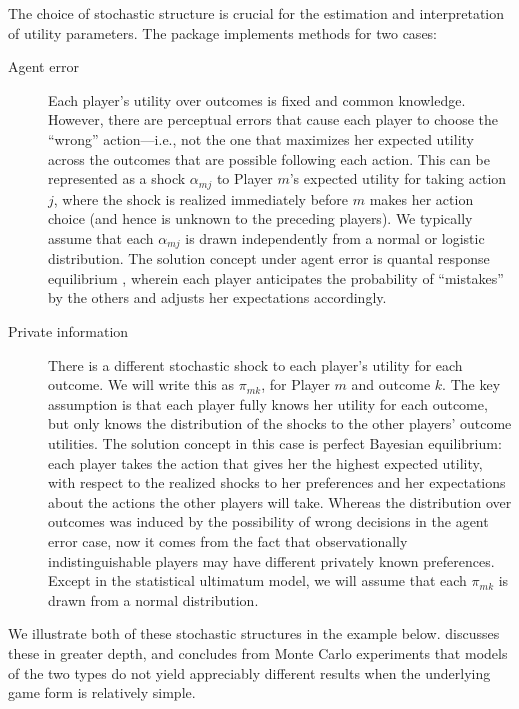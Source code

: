 \documentclass[article]{jss}
\begin{document}
The choice of stochastic structure is crucial for the estimation and
interpretation of utility parameters.  The  package implements
methods for two cases:
\begin{description}
  \item[Agent error] Each player's utility over outcomes is fixed and common
  knowledge.  However, there are perceptual errors that cause each player to
  choose the ``wrong'' action---i.e., not the one that maximizes her expected
  utility across the outcomes that are possible following each action.  This can
  be represented as a shock $\alpha_{mj}$ to Player $m$'s expected utility for
  taking action $j$, where the shock is realized immediately before $m$ makes
  her action choice (and hence is unknown to the preceding players).  We
  typically assume that each $\alpha_{mj}$ is drawn independently from a normal
  or logistic distribution.  The solution concept under agent error is quantal
  response equilibrium \citep{McKelvey1998}, wherein each player anticipates the
  probability of ``mistakes'' by the others and adjusts her expectations
  accordingly.

  \item[Private information] There is a different stochastic shock to each
  player's utility for each outcome.  We will write this as $\pi_{mk}$, for
  Player $m$ and outcome $k$.  The key assumption is that each player fully
  knows her utility for each outcome, but only knows the distribution of the
  shocks to the other players' outcome utilities.  The solution concept in this
  case is perfect Bayesian equilibrium: each player takes the action that gives
  her the highest expected utility, with respect to the realized shocks to her
  preferences and her expectations about the actions the other players will
  take.  Whereas the distribution over outcomes was induced by the possibility
  of wrong decisions in the agent error case, now it comes from the fact that
  observationally indistinguishable players may have different privately known
  preferences.  Except in the statistical ultimatum model, we will assume that
  each $\pi_{mk}$ is drawn from a normal distribution.
\end{description}
We illustrate both of these stochastic structures in the  example
below. \citet{Signorino2003} discusses these in greater depth, and concludes
from Monte Carlo experiments that models of the two types do not yield
appreciably different results when the underlying game form is relatively
simple.
\end{document}
